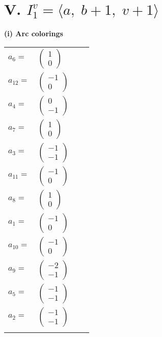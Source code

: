 \documentclass[1p]{elsarticle_modified}
\theoremstyle{definition}
\begin{document}
\centering \section*{V. $I^v_{1}= \langle a,\;b+1,\;v+1 \rangle$}
\flushleft \textbf{(i) Arc colorings}\\
\begin{tabular}{m{7pt} m{180pt} m{7pt} m{180pt} }
\flushright $a_{6}=$&$\begin{pmatrix}1\\0\end{pmatrix}$ \\
\flushright $a_{12}=$&$\begin{pmatrix}-1\\0\end{pmatrix}$ \\
\flushright $a_{4}=$&$\begin{pmatrix}0\\-1\end{pmatrix}$ \\
\flushright $a_{7}=$&$\begin{pmatrix}1\\0\end{pmatrix}$ \\
\flushright $a_{3}=$&$\begin{pmatrix}-1\\-1\end{pmatrix}$ \\
\flushright $a_{11}=$&$\begin{pmatrix}-1\\0\end{pmatrix}$ \\
\flushright $a_{8}=$&$\begin{pmatrix}1\\0\end{pmatrix}$ \\
\flushright $a_{1}=$&$\begin{pmatrix}-1\\0\end{pmatrix}$ \\
\flushright $a_{10}=$&$\begin{pmatrix}-1\\0\end{pmatrix}$ \\
\flushright $a_{9}=$&$\begin{pmatrix}-2\\-1\end{pmatrix}$ \\
\flushright $a_{5}=$&$\begin{pmatrix}-1\\-1\end{pmatrix}$ \\
\flushright $a_{2}=$&$\begin{pmatrix}-1\\-1\end{pmatrix}$\\&\end{tabular}
\end{document}
